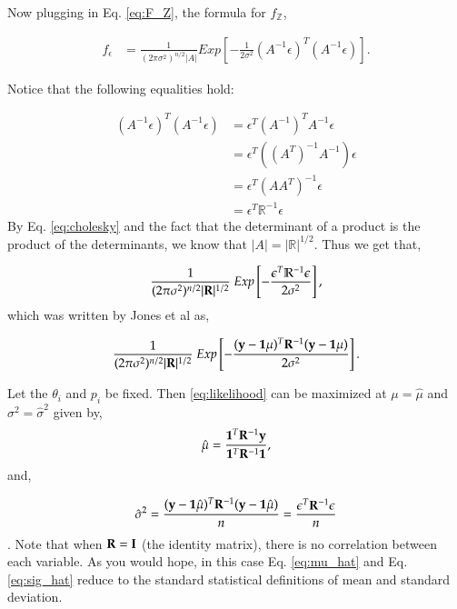 Now plugging in Eq. \ref{eq:F_Z}, the formula for $f_\mathbb{Z}$, 

\begin{align} \label{eq:getting_F_Y}
f_\epsilon &= \frac{1}{(2\pi\sigma^2)^{n/2}|A|} {E}xp\left [ -\frac{1}{2\sigma^2}(A^{-1}\epsilon)^T(A^{-1}\epsilon)\right ].
\end{align}

Notice that the following equalities hold:

\begin{align}
(A^{-1}\epsilon)^T(A^{-1}\epsilon) &= \epsilon^T(A^{-1})^TA^{-1}\epsilon \nonumber\\
			 						 &= \epsilon^T((A^T)^{-1}A^{-1})\epsilon\nonumber\\
									 &= \epsilon^T(AA^T)^{-1}\epsilon\nonumber\\
									 &= \epsilon^T\mathbb{R}^{-1}\epsilon
									 \label{eq:inverse}
\end{align}
By Eq. \ref{eq:cholesky} and the fact that the determinant of a product is the product of the determinants, we know that  $|A|=|\mathbb{R}|^{1/2}$. Thus we get that,

\begin{equation} \label{eq:likelihood1}
\frac{1}
  {(2\pi\sigma^2)^{n/2}|\mb{R}|^{1/2}}\ 
Exp \left 
  [ -\frac
    {\epsilon^T\mathbb{R}^{-1}\epsilon}
    {2\sigma^2} 
\right ],
\end{equation}
which was written by Jones et al as,

\begin{equation} \label{eq:likelihood}
\frac{1}
  {(2\pi\sigma^2)^{n/2}|\mb{R}|^{1/2}}\ 
Exp \left 
  [ -\frac
    {(\mb{y}-\mb{1}\mu)^T\mb{R}^{-1}(\mb{y}-\mb{1}\mu)}
    {2\sigma^2} 
\right ].
\end{equation}

Let the $\theta_i$ and $p_i$ be fixed. Then \ref{eq:likelihood} can be maximized at $\mu = \hat{\mu}$ and $\sigma^2 = \hat{\sigma}^2$ given by,
\begin{equation} \label{eq:mu_hat}
\hat{\mu}=\frac
	{\mathbf{1}^T\mathbf{R}^{-1}\mathbf{y}}
	{\mathbf{1}^T\mathbf{R}^{-1}\mathbf{1}},
\end{equation}
and,

\begin{equation} \label{eq:sig_hat}
\hat{\sigma}^2
    = \frac{(\mathbf{y}-\mathbf{1}\hat{\mu})^T\mathbf{R}^{-1}(\mathbf{y}-\mathbf{1}\hat{\mu})}{n} 
	= \frac{\epsilon^T\mathbf{R}^{-1}\epsilon}{n}
\end{equation}
\citep{jones_efficient_1998}. Note that when $\mathbf{R}=\mathbf{I}$ (the identity matrix), there is no correlation between each variable. As you would hope, in this case Eq. \ref{eq:mu_hat} and Eq. \ref{eq:sig_hat} reduce to the standard statistical definitions of mean and standard deviation.

